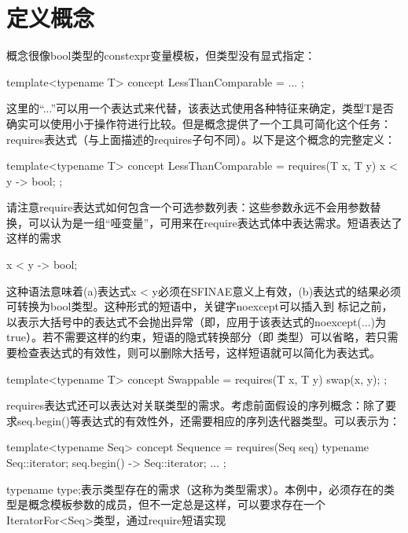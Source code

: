 \section{定义概念}
概念很像bool类型的constexpr变量模板，但类型没有显式指定：

\begin{cpp}
template<typename T> concept LessThanComparable = ... ;
\end{cpp}

这里的“...”可以用一个表达式来代替，该表达式使用各种特征来确定，类型T是否确实可以使用小于操作符进行比较。但是概念提供了一个工具可简化这个任务：requires表达式（与上面描述的requires子句不同）。以下是这个概念的完整定义：

\begin{cpp}
template<typename T>
concept LessThanComparable = requires(T x, T y) {
	{ x < y } -> bool;
};
\end{cpp}

请注意require表达式如何包含一个可选参数列表：这些参数永远不会用参数替换，可以认为是一组“哑变量”，可用来在require表达式体中表达需求。短语表达了这样的需求

\begin{cpp}
{ x < y } -> bool;
\end{cpp}

这种语法意味着(a)表达式x < y必须在SFINAE意义上有效，(b)表达式的结果必须可转换为bool类型。这种形式的短语中，关键字noexcept可以插入到 \inlcpp{->} 标记之前，以表示大括号中的表达式不会抛出异常（即，应用于该表达式的noexcept(...)为true）。若不需要这样的约束，短语的隐式转换部分（即 \inlcpp{->} 类型）可以省略，若只需要检查表达式的有效性，则可以删除大括号，这样短语就可以简化为表达式。

\begin{cpp}
template<typename T>
concept Swappable = requires(T x, T y) {
	swap(x, y);
};
\end{cpp}

requires表达式还可以表达对关联类型的需求。考虑前面假设的序列概念：除了要求seq.begin()等表达式的有效性外，还需要相应的序列迭代器类型。可以表示为：

\begin{cpp}
template<typename Seq>
concept Sequence = requires(Seq seq) {
	typename Seq::iterator;
	{ seq.begin() } -> Seq::iterator;
	...
};
\end{cpp}

typename type;表示类型存在的需求（这称为类型需求）。本例中，必须存在的类型是概念模板参数的成员，但不一定总是这样，可以要求存在一个IteratorFor<Seq>类型，通过require短语实现

